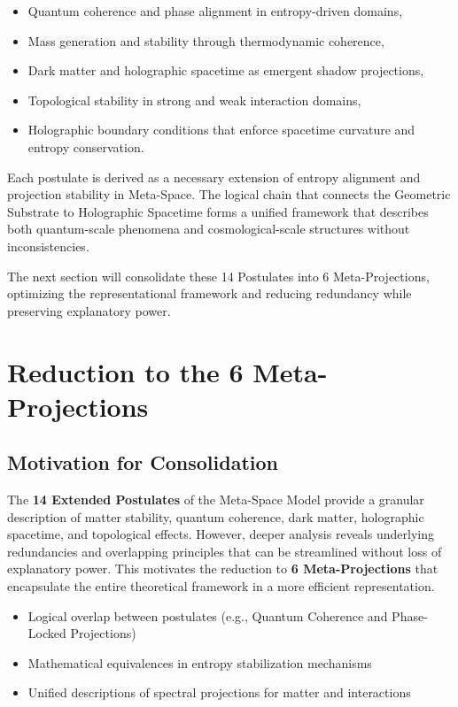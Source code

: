 \documentclass[10.5pt,a4paper]{article}
\begin{document}
\begin{itemize}
  \item Quantum coherence and phase alignment in entropy-driven domains,
  \item Mass generation and stability through thermodynamic coherence,
  \item Dark matter and holographic spacetime as emergent shadow projections,
  \item Topological stability in strong and weak interaction domains,
  \item Holographic boundary conditions that enforce spacetime curvature and entropy conservation.
\end{itemize}

Each postulate is derived as a necessary extension of entropy alignment and projection stability in Meta-Space. 
The logical chain that connects the Geometric Substrate to Holographic Spacetime forms a unified framework 
that describes both quantum-scale phenomena and cosmological-scale structures without inconsistencies.

The next section will consolidate these 14 Postulates into 6 Meta-Projections, optimizing the representational 
framework and reducing redundancy while preserving explanatory power.

\clearpage

\section{Reduction to the 6 Meta-Projections}

\subsection{Motivation for Consolidation}

The \textbf{14 Extended Postulates} of the Meta-Space Model provide a granular description of matter stability, quantum coherence, dark matter, holographic spacetime, and topological effects. However, deeper analysis reveals underlying redundancies and overlapping principles that can be streamlined without loss of explanatory power. This motivates the reduction to \textbf{6 Meta-Projections} that encapsulate the entire theoretical framework in a more efficient representation.

\begin{itemize}
    \item Logical overlap between postulates (e.g., Quantum Coherence and Phase-Locked Projections)
    \item Mathematical equivalences in entropy stabilization mechanisms
    \item Unified descriptions of spectral projections for matter and interactions
\end{itemize}
\end{document}
